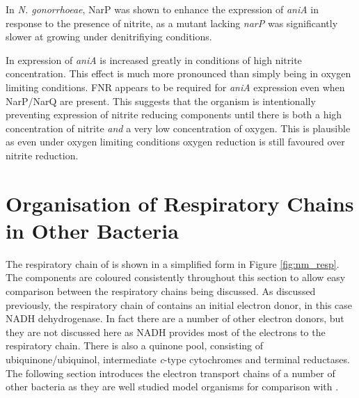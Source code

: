 In \textit{N. gonorrhoeae}, NarP was shown to enhance the expression of \textit{aniA} in response to the presence of nitrite, as a mutant lacking \textit{narP} was significantly slower at growing under denitrifiying conditions\cite{Overton2006}.

In \Nm{} expression of \textit{aniA} is increased greatly in conditions of high nitrite concentration\cite{Rock2005}. This effect is much more pronounced than simply being in oxygen limiting conditions. FNR appears to be required for \textit{aniA} expression even when NarP/NarQ are present\cite{Rock2005}. This suggests that the organism is intentionally preventing expression of nitrite reducing components until there is both a high concentration of nitrite \textit{and} a very low concentration of oxygen. This is plausible as even under oxygen limiting conditions oxygen reduction is still favoured over nitrite reduction.

\section{Organisation of Respiratory Chains in Other Bacteria}
The respiratory chain of \Nm{} is shown in a simplified form in Figure \ref{fig:nm_resp}. The components are coloured consistently throughout this section to allow easy comparison between the respiratory chains being discussed. As discussed previously, the respiratory chain of \Nm{} contains an initial electron donor, in this case NADH dehydrogenase. In fact there are a number of other electron donors, but they are not discussed here as NADH provides most of the electrons to the respiratory chain. There is also a quinone pool, consisting of ubiquinone/ubiquinol, intermediate \textit{c}-type cytochromes and terminal reductases. The following section introduces the electron transport chains of a number of other bacteria as they are well studied model organisms for comparison with \Nm{}.

